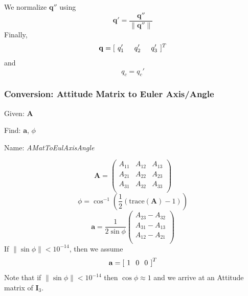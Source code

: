 %
We normalize $\mathbf{q}''$ using
%
\begin{equation}
    \mathbf{q}' = \frac{\mathbf{q}''}{\| \mathbf{q}'' \|}
\end{equation}
%
Finally,
%
\begin{equation}
   \mathbf{q} = [\hspace{.05 in} q_{1}' \hspace{.2 in} q_{2}' \hspace{.2 in} q_3'
   \hspace{.05 in}]^T
\end{equation}
%
and
%
\begin{equation}
     q_c = q_c'
\end{equation}

\subsubsection{Conversion:  Attitude Matrix to Euler Axis/Angle}


Given:  $\mathbf{A}$

\noindent Find:  $\mathbf{a}$, $\phi$

\noindent Name:  \emph{AMatToEulAxisAngle}

\begin{equation}
     \mathbf{A}  = \begin{pmatrix}
     A_{11} & A_{12} & A_{13}\\
     A_{21} & A_{22} & A_{23}\\
     A_{31} & A_{32} & A_{33}\\
     \end{pmatrix}
\end{equation}
%
\begin{equation}
   \phi = \cos^{-1}\left( \frac{1}{2}\left(\mbox{trace}(\mathbf{A}) -
   1 \right)\right)
\end{equation}
%
\begin{equation}
    \mathbf{a} = \frac{1}{2\sin{\phi}}\begin{pmatrix}
     A_{23} - A_{32}\\
     A_{31} - A_{13}\\
     A_{12} - A_{21}\\
     \end{pmatrix}
\end{equation}
%
If $\|\sin{\phi} \| < 10^{-14}$, then we assume
%
\begin{equation}
    \mathbf{a} = \left[\hspace{.05 in} 1 \hspace{.1 in} 0 \hspace{.1 in}
    0 \hspace{.05 in} \right]^T
\end{equation}
%
Note that if $\|\sin{\phi} \| < 10^{-14}$ then $\cos{\phi} \approx
1 $ and we arrive at an Attitude matrix of $\mathbf{I}_3$.

